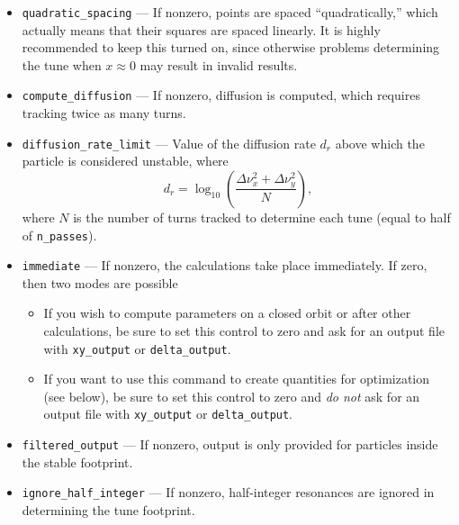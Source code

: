\documentclass[11pt]{article}
\begin{document}
\begin{itemize}
\item \verb|quadratic_spacing| --- If nonzero, points are spaced ``quadratically,'' which actually means that
  their squares are spaced linearly. It is highly recommended to keep this turned on, since otherwise problems determining the
  tune when $x \approx 0$ may result in invalid results.
\item \verb|compute_diffusion| --- If nonzero, diffusion is computed, which requires tracking twice as many turns.
\item \verb|diffusion_rate_limit| --- Value of the diffusion rate $d_r$ above which the particle is considered unstable,
where
\begin{equation}
  d_r = \log_{10} \left(\frac{\Delta\nu_x^2 + \Delta\nu_y^2}{N}\right),
\end{equation}
where $N$ is the number of turns tracked to determine each tune (equal to half of \verb|n_passes|).
\item \verb|immediate| --- If nonzero, the calculations take place immediately. If zero, then two modes are possible
  \begin{itemize}
    \item If you wish to compute parameters on a closed orbit or after other calculations, be sure to set this control to zero
      and ask for an output file with \verb|xy_output| or \verb|delta_output|.
    \item If you want to use this command to create quantities for optimization (see below), be sure to set this control to zero
      and {\em do not} ask for an output file with \verb|xy_output| or \verb|delta_output|.
  \end{itemize}
\item \verb|filtered_output| --- If nonzero, output is only provided for particles inside the stable footprint.
\item \verb|ignore_half_integer| --- If nonzero, half-integer resonances are ignored in determining the tune footprint.
\end{itemize}
\end{document}
